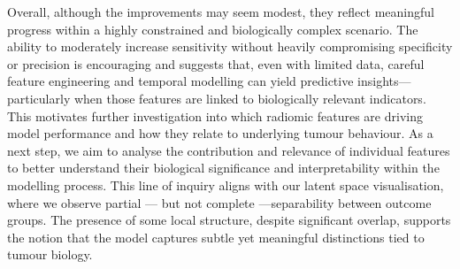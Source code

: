 \documentclass[12pt, a4paper]{report}
\begin{document}
Overall, although the improvements may seem modest, they reflect meaningful progress within a highly constrained and biologically complex scenario. The ability to moderately increase sensitivity without heavily compromising specificity or precision is encouraging and suggests that, even with limited data, careful feature engineering and temporal modelling can yield predictive insights—particularly when those features are linked to biologically relevant indicators. This motivates further investigation into which radiomic features are driving model performance and how they relate to underlying tumour behaviour. As a next step, we aim to analyse the contribution and relevance of individual features to better understand their biological significance and interpretability within the modelling process. This line of inquiry aligns with our latent space visualisation, where we observe partial — but not complete —separability between outcome groups. The presence of some local structure, despite significant overlap, supports the notion that the model captures subtle yet meaningful distinctions tied to tumour biology.

\vspace{0.5cm}
\end{document}

